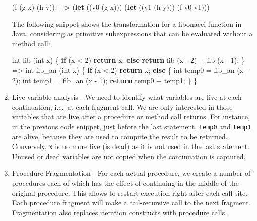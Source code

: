 \documentclass[12pt,a4paper,oneside,openright]{book}
\newenvironment{Shaded}{\begin{snugshade}}{\end{snugshade}}
\newcommand{\KeywordTok}[1]{\textcolor[rgb]{0.13,0.29,0.53}{\textbf{{#1}}}}
\newcommand{\DataTypeTok}[1]{\textcolor[rgb]{0.13,0.29,0.53}{{#1}}}
\newcommand{\DecValTok}[1]{\textcolor[rgb]{0.00,0.00,0.81}{{#1}}}
\newcommand{\FunctionTok}[1]{\textcolor[rgb]{0.00,0.00,0.00}{{#1}}}
\newcommand{\NormalTok}[1]{{#1}}
\begin{document}
\begin{enumerate}
\begin{Shaded}
\begin{Highlighting}[]
\NormalTok{(f (g x) (h y))}
    \KeywordTok{=>}
\NormalTok{(}\KeywordTok{let} \NormalTok{((v0 (g x)))}
    \NormalTok{(}\KeywordTok{let} \NormalTok{((v1 (h y)))}
        \NormalTok{(f v0 v1)))}
\end{Highlighting}
\end{Shaded}

  The following snippet shows the transformation for a fibonacci
  function in Java, considering as primitive subexpressions that can be
  evaluated without a method call:

\begin{Shaded}
\begin{Highlighting}[]
\DataTypeTok{int} \FunctionTok{fib} \NormalTok{(}\DataTypeTok{int} \NormalTok{x) \{}
    \KeywordTok{if} \NormalTok{(x < }\DecValTok{2}\NormalTok{)}
        \KeywordTok{return} \NormalTok{x;}
    \KeywordTok{else}
        \KeywordTok{return} \FunctionTok{fib} \NormalTok{(x - }\DecValTok{2}\NormalTok{) + }\FunctionTok{fib} \NormalTok{(x - }\DecValTok{1}\NormalTok{);}
\NormalTok{\}}
    \NormalTok{=>}
\DataTypeTok{int} \FunctionTok{fib_an} \NormalTok{(}\DataTypeTok{int} \NormalTok{x) \{}
    \KeywordTok{if} \NormalTok{(x < }\DecValTok{2}\NormalTok{)}
        \KeywordTok{return} \NormalTok{x;}
    \KeywordTok{else} \NormalTok{\{}
        \DataTypeTok{int} \NormalTok{temp0 = }\FunctionTok{fib_an} \NormalTok{(x - }\DecValTok{2}\NormalTok{);}
        \DataTypeTok{int} \NormalTok{temp1 = }\FunctionTok{fib_an} \NormalTok{(x - }\DecValTok{1}\NormalTok{);}
        \KeywordTok{return} \NormalTok{temp0 + temp1;}
    \NormalTok{\}}
\NormalTok{\}}
\end{Highlighting}
\end{Shaded}
\item
  Live variable analysis - We need to identify what variables are live
  at each continuation, i.e.~at each fragment call. We are only
  interested in those variables that are live after a procedure or
  method call returns. For instance, in the previous code snippet, just
  before the last statement, \texttt{temp0} and \texttt{temp1} are
  alive, because they are used to compute the result to be returned.
  Conversely, \texttt{x} is no more live (is dead) as it is not used in
  the last statement. Unused or dead variables are not copied when the
  continuation is captured.
\item
  Procedure Fragmentation - For each actual procedure, we create a
  number of procedures each of which has the effect of continuing in the
  middle of the original procedure. This allows to restart execution
  right after each call site. Each procedure fragment will make a
  tail-recursive call to the next fragment. Fragmentation also replaces
  iteration constructs with procedure calls.


\end{enumerate}
\end{document}

